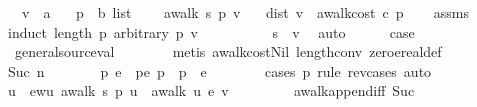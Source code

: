 \begin{isabellebody}
\ \ \ v\ {\isacharcolon}{\isacharcolon}\ {\isacharprime}a\isanewline
\ \ \ p\ {\isacharcolon}{\isacharcolon}\ {\isachardoublequoteopen}{\isacharprime}b\ list{\isachardoublequoteclose}\ \isanewline
\ \ \ {\isachardoublequoteopen}awalk\ s\ p\ v{\isachardoublequoteclose}\isanewline
\ \ \ {\isachardoublequoteopen}dist\ v\ {\isasymle}\ awalk{\isacharunderscore}cost\ c\ p{\isachardoublequoteclose}\isanewline
%
\isadelimproof
\ \ %
\endisadelimproof
%
\isatagproof
{}\isamarkupfalse%
\ assms\isanewline
\ \ \isamarkupfalse%
\ {\isacharparenleft}induct\ {\isachardoublequoteopen}length\ p{\isachardoublequoteclose}\ arbitrary{\isacharcolon}\ p\ v{\isacharparenright}\isanewline
\ \ \isamarkupfalse%
\ {}\isanewline
\ \ \ \ \isamarkupfalse%
\ {\isachardoublequoteopen}s\ {\isacharequal}\ v{\isachardoublequoteclose}\ \isamarkupfalse%
\ auto\isanewline
\ \ \ \ \isamarkupfalse%
\ {\isacharquery}case\ \isamarkupfalse%
\ {}{\isacharparenleft}{}{\isacharparenright}\ general{\isacharunderscore}source{\isacharunderscore}val\isanewline
\ \ \ \ \ \ \isamarkupfalse%
\ {\isacharparenleft}metis\ awalk{\isacharunderscore}cost{\isacharunderscore}Nil\ length{\isacharunderscore}{}{\isacharunderscore}conv\ zero{\isacharunderscore}ereal{\isacharunderscore}def{\isacharparenright}\isanewline
\ \ \isamarkupfalse%
\isanewline
\ \ \isamarkupfalse%
\ {\isacharparenleft}Suc\ n{\isacharparenright}\isanewline
\ \ \ \ \isamarkupfalse%
\ \isamarkupfalse%
\ p{\isacharprime}\ e\ \ p{\isacharprime}e{\isacharcolon}\ {\isachardoublequoteopen}p\ {\isacharequal}\ p{\isacharprime}\ {\isacharat}\ {\isacharbrackleft}e{\isacharbrackright}{\isachardoublequoteclose}\isanewline
\ \ \ \ \ \ \isamarkupfalse%
\ {\isacharparenleft}cases\ p\ rule{\isacharcolon}\ rev{\isacharunderscore}cases{\isacharparenright}\ auto\isanewline
\ \ \ \ \isamarkupfalse%
\ \isamarkupfalse%
\ u\ \ ewu{\isacharcolon}\ {\isachardoublequoteopen}awalk\ s\ p{\isacharprime}\ u\ {\isasymand}\ awalk\ u\ {\isacharbrackleft}e{\isacharbrackright}\ v{\isachardoublequoteclose}\ \isanewline
\ \ \ \ \ \ \isamarkupfalse%
\ awalk{\isacharunderscore}append{\isacharunderscore}iff\ Suc{\isacharparenleft}{}{\isacharparenright}\ \isamarkupfalse%

\end{isabellebody}
